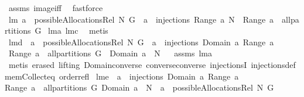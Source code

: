 \begin{isabellebody}
%
\isatagproof
{}\isamarkupfalse%
\ assms\ image{\isacharunderscore}iff\ \isamarkupfalse%
\ fastforce%
\endisatagproof
{\isafoldproof}%
%
\isadelimproof
%
\endisadelimproof
\isanewline
\isanewline
{}\isamarkupfalse%
\ lm{}{}{\isacharcolon}\ {\isachardoublequoteopen}a\ {\isasymin}\ possibleAllocationsRel\ N\ G\ {\isacharequal}\ {\isacharparenleft}a{\isacharcircum}{\isacharminus}{}\ {\isasymin}\ injections\ {\isacharparenleft}Range\ a{\isacharparenright}\ N\ {\isacharampersand}\ Range\ a\ {\isasymin}\ all{\isacharunderscore}partitions\ G{\isacharparenright}{\isachardoublequoteclose}\isanewline
%
\isadelimproof
%
\endisadelimproof
%
\isatagproof
{}\isamarkupfalse%
\ lm{}{}a\ lm{}{}c\ \isamarkupfalse%
\ metis%
\endisatagproof
{\isafoldproof}%
%
\isadelimproof
\isanewline
%
\endisadelimproof
\isanewline
{}\isamarkupfalse%
\ lm{}{}d{\isacharcolon}\ \ {\isachardoublequoteopen}a\ {\isasymin}\ possibleAllocationsRel\ N\ G{\isachardoublequoteclose}\ \ {\isachardoublequoteopen}{\isacharparenleft}a\ {\isasymin}\ injections\ {\isacharparenleft}Domain\ a{\isacharparenright}\ {\isacharparenleft}Range\ a{\isacharparenright}\ \isanewline
{\isacharampersand}\ Range\ a\ {\isasymin}\ all{\isacharunderscore}partitions\ G\ {\isacharampersand}\ Domain\ a\ {\isasymsubseteq}\ N{\isacharparenright}{\isachardoublequoteclose}%
\isadelimproof
\ %
\endisadelimproof
%
\isatagproof
{}\isamarkupfalse%
\ assms\ lm{}{}a\ \isanewline
{}\isamarkupfalse%
\ {\isacharparenleft}metis\ {\isacharparenleft}erased{\isacharcomma}\ lifting{\isacharparenright}\ Domain{\isacharunderscore}converse\ converse{\isacharunderscore}converse\ injectionsI\ injections{\isacharunderscore}def\ mem{\isacharunderscore}Collect{\isacharunderscore}eq\ order{\isacharunderscore}refl{\isacharparenright}%
\endisatagproof
{\isafoldproof}%
%
\isadelimproof
%
\endisadelimproof
\isanewline
\isanewline
{}\isamarkupfalse%
\ lm{}{}e{\isacharcolon}\ \ {\isachardoublequoteopen}a\ {\isasymin}\ injections\ {\isacharparenleft}Domain\ a{\isacharparenright}\ {\isacharparenleft}Range\ a{\isacharparenright}{\isachardoublequoteclose}\ \isanewline
{\isachardoublequoteopen}Range\ a\ {\isasymin}\ all{\isacharunderscore}partitions\ G{\isachardoublequoteclose}\ {\isachardoublequoteopen}Domain\ a\ {\isasymsubseteq}\ N{\isachardoublequoteclose}\ \ {\isachardoublequoteopen}a\ {\isasymin}\ possibleAllocationsRel\ N\ G{\isachardoublequoteclose}\ \isanewline

\end{isabellebody}
